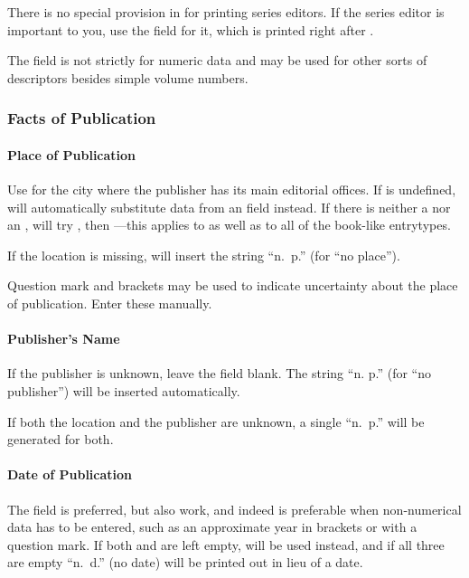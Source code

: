 \documentclass{ltxdockit}[2010/02/12]
\begin{document}
There is no special provision in  for printing series editors. If the series editor is important to you, use the  field for it, which is printed right after .\autocites[Here the  field is used for the series editor:][]{potter2001gender-series}

The  field is not strictly for numeric data and may be used for other sorts of descriptors besides simple volume numbers.

\subsubsection{Facts of Publication}
\paragraph{Place of Publication}
Use  for the city where the publisher has its main editorial offices. If  is undefined,  will automatically substitute data from an  field instead. If there is neither a  nor an ,  will try , then ---this applies to  as well as to all of the book-like entrytypes.

If the location is missing,  will insert the string ``n.~p.'' (for ``no place'').\autocites{2449:noplace} 

Question mark and brackets may be used to indicate uncertainty about the place of publication. Enter these manually.\autocites[][]{2449:uncertain}

\paragraph{Publisher's Name}

If the publisher is unknown, leave the field blank. The string ``n. p.'' (for ``no publisher'') will be inserted automatically.\autocites[][]{2449:nopub}

If both the location and the publisher are unknown, a single \enquote{n.~p.} will be generated for both.\autocites[][]{2449:neither}

\paragraph{Date of Publication}
The  field is preferred, but  also work, and indeed is preferable when non-numerical data has to be entered, such as   an approximate year in brackets or with a question mark.\autocites{538}
If both  and  are left empty,  will be used instead, and if all three are empty ``n.~d.'' (\ie no date) will be printed out in lieu of a date.\autocites[][]{954}
\end{document}
